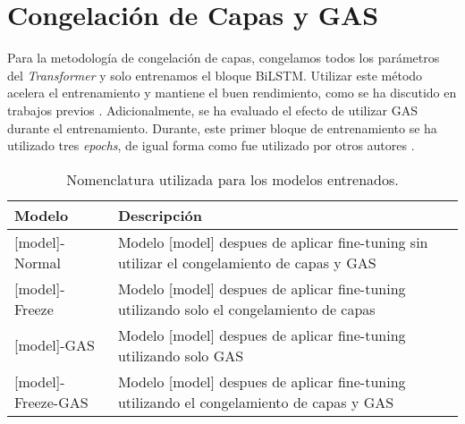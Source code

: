 \section{Congelación de Capas y GAS}

Para la metodología de congelación de capas, congelamos todos los parámetros del \textit{Transformer} y solo entrenamos el bloque BiLSTM. Utilizar este método acelera el entrenamiento y mantiene el buen rendimiento, como se ha discutido en trabajos previos \citep{merchant2020happens,lee2019would,kovaleva2019revealing}. Adicionalmente, se ha evaluado el efecto de utilizar GAS durante el entrenamiento. Durante, este primer bloque de entrenamiento se ha utilizado tres \textit{epochs}, de igual forma como fue utilizado por otros autores \citep{zhang2022hlab}.

\begin{table}[]
	\centering
	\caption[Nomenclatura utilizada para los modelos entrenados.]{Nomenclatura utilizada para los modelos entrenados.}
	\label{tab:cmodel_names}
	
	\setlength{\tabcolsep}{0.5em} %
	{\renewcommand{\arraystretch}{1.5}%
	\begin{tabular}{lp{10cm}}
		\textbf{Modelo}                 & \textbf{Descripción}                                                                                    \\ \hline
		{[}model{]}-Normal     & Modelo {[}model{]} despues de aplicar fine-tuning sin utilizar el congelamiento de capas y GAS \\
		{[}model{]}-Freeze     & Modelo {[}model{]} despues de aplicar fine-tuning utilizando solo el congelamiento de capas    \\
		{[}model{]}-GAS        & Modelo {[}model{]} despues de aplicar fine-tuning utilizando solo GAS                          \\
		{[}model{]}-Freeze-GAS & Modelo {[}model{]} despues de aplicar fine-tuning utilizando el congelamiento de capas y GAS  
	\end{tabular}
}
\end{table}
